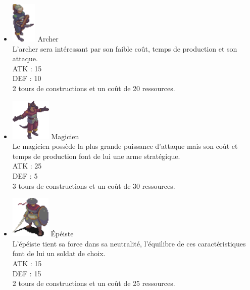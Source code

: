    \begin{itemize}
    \item    \includegraphics[scale=0.31]{troops/bow.png} Archer\\
   L'archer sera intéressant par son faible coût, temps de production et son attaque.\\
    ATK : 15\\
    DEF : 10\\
    2 tours de constructions et un coût de 20 ressources.\\
    
    \item \includegraphics[scale=0.31]{troops/wiz.png} Magicien\\
     Le magicien possède la plus grande puissance d'attaque mais son coût et temps de production font de lui une arme stratégique.\\
    ATK : 25\\
    DEF : 5\\
    3 tours de constructions et un coût de 30 ressources.\\
    
    \item \includegraphics[scale=0.31]{troops/sword.png}  Épéiste\\
         L'épéiste tient sa force dans sa neutralité, l'équilibre de ces caractéristiques font de lui un soldat de choix.\\
    ATK : 15\\
    DEF : 15\\
    2 tours de constructions et un coût de 25 ressources.\\
    

\end{itemize}
